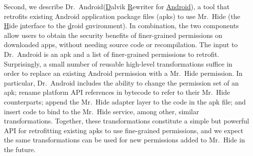 \documentclass[preprint]{sig-alternate-10pt}
\newcommand{\lib}{Mr.\ Hide\xspace}
\newcommand{\rewriter}{Dr.\ Android\xspace}
\newcommand{\perm}[1]{\textsf{\textit{#1}}}
\newcommand{\comment}[3][\color{red}]{}%
\newcommand{\jeff}[1]{\comment[\color{green}]{JSF}{#1}}
\begin{document}


Second, we describe \rewriter (\underline{D}alvik \underline{R}ewriter
for \underline{Android}), a tool that retrofits existing Android
application package files (apks) to use \lib 
(the \underline{H}ide \underline{i}nterface to the 
     \underline{d}roid \underline{e}nvironment).
In combination, the two
components allow users to obtain the security benefits of
finer-grained permissions on downloaded apps, without needing source
code or recompilation.  The input to \rewriter is an apk and a list of
finer-grained permissions to retrofit.  Surprisingly, a small number
of reusable high-level transformations suffice in
order to replace an existing Android permission with a \lib
permission. In particular, \rewriter includes the ability to
change the permission set of an apk; rename
platform API references in bytecode to refer to their \lib
counterparts; append the \lib adapter layer to the code in the apk
file; and insert code to bind to the \lib service, among other,
similar transformations. 
Together, these transformations constitute a simple but powerful API
for retrofitting existing apks to use
fine-grained permissions, and we expect the same
transformations can be used for new permissions
added to \lib in the future.
\end{document}
